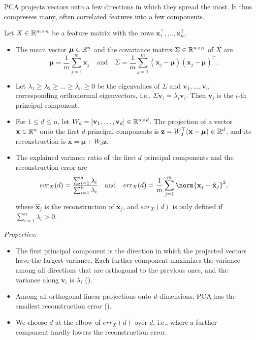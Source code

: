 PCA projects vectors onto a few directions in which they spread the most. It thus compresses many, often correlated features into a few components.

\begin{definition}
	\label{def:prelim:pca}
	Let $X \in \mathbb R^{m \times n}$ be a feature matrix with the rows $\mathbf{x}_1^\top, \dots, \mathbf{x}_m^\top$.
	\begin{itemize}
		\item The mean vector $\boldsymbol{\mu} \in \mathbb R^n$ and the covariance matrix $\Sigma \in \mathbb R^{n \times n}$ of $X$ are
		      \[
			      \boldsymbol{\mu} = \frac{1}{m} \sum_{j=1}^{m} \mathbf{x}_j
			      \quad\text{and}\quad
			      \Sigma = \frac{1}{m} \sum_{j=1}^{m} (\mathbf{x}_j - \boldsymbol{\mu})(\mathbf{x}_j - \boldsymbol{\mu})^\top.
		      \]
		\item Let $\lambda_1 \ge \lambda_2 \ge \dots \ge \lambda_n \ge 0$ be the eigenvalues of $\Sigma$ and $\mathbf{v}_1, \dots, \mathbf{v}_n$ corresponding orthonormal eigenvectors, i.e., $\Sigma \mathbf{v}_i = \lambda_i \mathbf{v}_i$. Then $\mathbf{v}_i$ is the $i$-th principal component.
		\item For $1 \le d \le n$, let $W_d = [\mathbf{v}_1, \dots, \mathbf{v}_d] \in \mathbb R^{n \times d}$. The projection of a vector $\mathbf{x} \in \mathbb R^n$ onto the first $d$ principal components is $\mathbf{z} = W_d^\top (\mathbf{x} - \boldsymbol{\mu}) \in \mathbb R^d$, and its reconstruction is $\hat{\mathbf{x}} = \boldsymbol{\mu} + W_d \mathbf{z}$.
		\item The explained variance ratio of the first $d$ principal components and the reconstruction error are
		      \[
			      \mathit{evr}_X(d) = \frac{\sum_{i=1}^{d} \lambda_i}{\sum_{i=1}^{n} \lambda_i}
			      \quad\text{and}\quad
			      \mathit{err}_X(d) = \frac{1}{m} \sum_{j=1}^{m} \norm{\mathbf{x}_j - \hat{\mathbf{x}}_j}^2,
		      \]
		      where $\hat{\mathbf{x}}_j$ is the reconstruction of $\mathbf{x}_j$, and $\mathit{evr}_X(d)$ is only defined if $\sum_{i=1}^{n} \lambda_i > 0$.
	\end{itemize}
\end{definition}

\noindent\emph{Properties:}
\begin{itemize}[beginpenalty=10000]
	\item The first principal component is the direction in which the projected vectors have the largest variance. Each further component maximizes the variance among all directions that are orthogonal to the previous ones, and the variance along $\mathbf{v}_i$ is $\lambda_i$ (\textcite{alpaydin2010introduction}).
	\item Among all orthogonal linear projections onto $d$ dimensions, PCA has the smallest reconstruction error (\textcite{alpaydin2010introduction}).
	\item We choose $d$ at the elbow of $\mathit{err}_X(d)$ over $d$, i.e., where a further component hardly lowers the reconstruction error.
\end{itemize}

